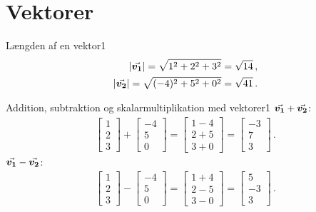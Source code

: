 \section*{Vektorer}
\begin{opgave}{Længden af en vektor}{1}
	\begin{align*}
	\left| {\vec{\boldsymbol{v_1}}} \right| = \sqrt{1^2+2^2+3^2} = \sqrt{14} \, , \\
	\left| {\vec{\boldsymbol{v_2}}} \right| = \sqrt{(-4)^2+5^2+0^2} = \sqrt{41} \, .
	\end{align*}
\end{opgave}
\begin{opgave}{Addition, subtraktion og skalarmultiplikation med vektorer}{1}
	\opg ${\vec{\boldsymbol{v_1}}}+{\vec{\boldsymbol{v_2}}}$:
	\begin{align*}
	\begin{bmatrix} 1 \\ 2 \\ 3 \end{bmatrix} + \begin{bmatrix} -4 \\ 5 \\ 0 \end{bmatrix} = \begin{bmatrix} 1-4 \\ 2+5 \\ 3+0 \end{bmatrix} = \begin{bmatrix} -3 \\ 7 \\ 3 \end{bmatrix} \, .
	\end{align*}
	\opg ${\vec{\boldsymbol{v_1}}}-{\vec{\boldsymbol{v_2}}}$:
	\begin{align*}
	\begin{bmatrix} 1 \\ 2 \\ 3 \end{bmatrix} - \begin{bmatrix} -4 \\ 5 \\ 0 \end{bmatrix} = \begin{bmatrix} 1+4 \\ 2-5 \\ 3-0 \end{bmatrix} = \begin{bmatrix} 5 \\ -3 \\ 3 \end{bmatrix} \, .
	\end{align*}

\end{opgave}
